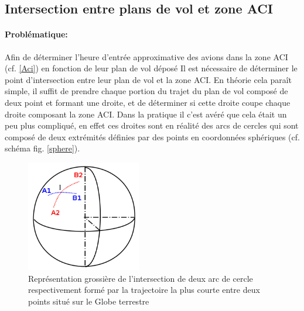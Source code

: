     \subsection{Intersection entre plans de vol et zone ACI\label{mathcoord}}
            \paragraph{Problématique:}
Afin de déterminer l'heure d'entrée approximative des avions dans la zone ACI (cf. \vref{Aci}) en fonction de leur plan de vol déposé Il est nécessaire de déterminer le point d'intersection entre leur plan de vol et la zone ACI. En théorie cela paraît simple, il suffit de prendre chaque portion du trajet du plan de vol composé de deux point et formant une droite, et  de déterminer si cette droite coupe chaque droite composant la zone ACI. Dans la pratique il c'est avéré que cela était un peu plus compliqué, en effet ces droites sont en réalité des arcs de cercles qui sont composé de deux extrémités définies par des points en coordonnées sphériques (cf. schéma fig. \vref{sphere}).
\begin{figure}
    \center
    \includegraphics[width=5cm]{images/Sphere.png}
    \caption{Représentation grossière de l'intersection de deux arc de cercle respectivement formé par la trajectoire la plus courte entre deux points situé sur le Globe terrestre}
    \label{sphere}
\end{figure}
